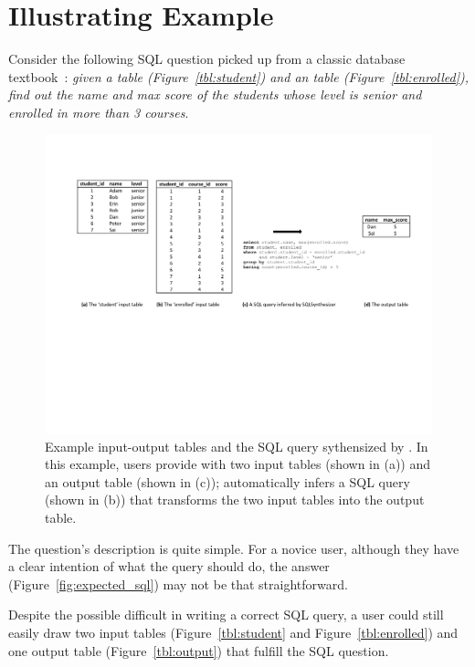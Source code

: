\section{Illustrating Example}
\label{sec:example}

Consider the following SQL question picked up from a classic
database textbook~\cite{cowbook}: \textit{given a  table (Figure~\ref{tbl:student})
and an  table (Figure~\ref{tbl:enrolled}), find out the name and max score of the
students whose level is senior and enrolled in more than 3 courses}.


\begin{figure}[t]
  \centering
  \includegraphics[scale=0.70]{motivating}
  \vspace*{-1.0ex}\caption {{\label{fig:motivating}
  Example input-output tables and the SQL query sythensized by
  \ourtool. In this example, users provide \ourtool with
  two input tables (shown in (a)) and an output table (shown in (c));
  \ourtool automatically infers a SQL query (shown in (b)) that
  transforms the two input tables into the output table.
}}
\end{figure}


The question's description is quite simple.
For a novice user, although they have a clear
intention of what the query should do, the answer (Figure~\ref{fig:expected_sql}) may
not be that straightforward. 

Despite the possible difficult in writing a correct SQL query,
a user could still easily draw
two input tables (Figure~\ref{tbl:student} and Figure~\ref{tbl:enrolled})
and one output table (Figure~\ref{tbl:output}) that fulfill the
SQL question.

